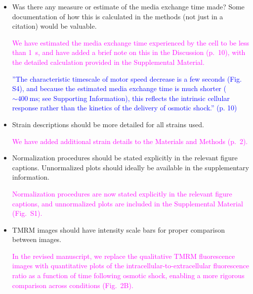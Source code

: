 \documentclass[11pt, letterpaper]{article}%
\newcommand{\revised}{\textcolor{blue}}
\newcommand{\response}{\textcolor{magenta}}
\begin{document}
\begin{itemize}
\item Was there any measure or estimate of the media exchange time made? Some documentation of how this is calculated in the methods (not just in a citation) would be valuable.


\response{We have estimated the media exchange time experienced by the cell to be less than 1~s, and have added a brief note on this in the Discussion (p.~10), with the detailed calculation provided in the Supplemental Material.}

\begin{mdframed}
\revised{''The characteristic timescale of motor speed decrease is a few seconds (Fig. S4), and because the estimated media exchange time is much shorter ($\sim400~\textrm{ms}$; see Supporting Information), this reflects the intrinsic cellular response rather than the kinetics of the delivery of osmotic shock.'' (p. 10)}
\end{mdframed}

\item Strain descriptions should be more detailed for all strains used.

\response{We have added additional strain details to the Materials and Methods (p.~2).}

\item Normalization procedures should be stated explicitly in the relevant figure captions. Unnormalized plots should ideally be available in the supplementary information.

\response{Normalization procedures are now stated explicitly in the relevant figure captions, and unnormalized plots are included in the Supplemental Material (Fig.~S1).}

\item TMRM images should have intensity scale bars for proper comparison between images.

\response{In the revised manuscript, we replace the qualitative TMRM fluorescence images with quantitative plots of the intracellular-to-extracellular fluorescence ratio as a function of time following osmotic shock, enabling a more rigorous comparison across conditions (Fig.~2B).}

\end{itemize}
\end{document}
